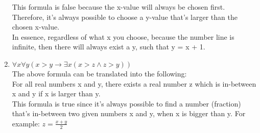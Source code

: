 \begin{enumerate}
This formula is false because the x-value will always be chosen first. Therefore, it's always possible to choose a y-value that's larger than the chosen x-value. \\

In essence, regardless of what x you choose, because the number line is infinite, then there will always exist a y, such that y = x + 1.

\item $\forall x \forall y(x>y \to \exists x(x > z \land z > y))$ \\
The above formula can be translated into the following: \\
For all real numbers x and y, there exists a real number z which is in-between x and y if x is larger than y. \\

This formula is true since it's always possible to find a number (fraction) that's in-between two given numbers x and y, when x is bigger than y. For example: $z = \frac{x+y}{2}$
\end{enumerate}